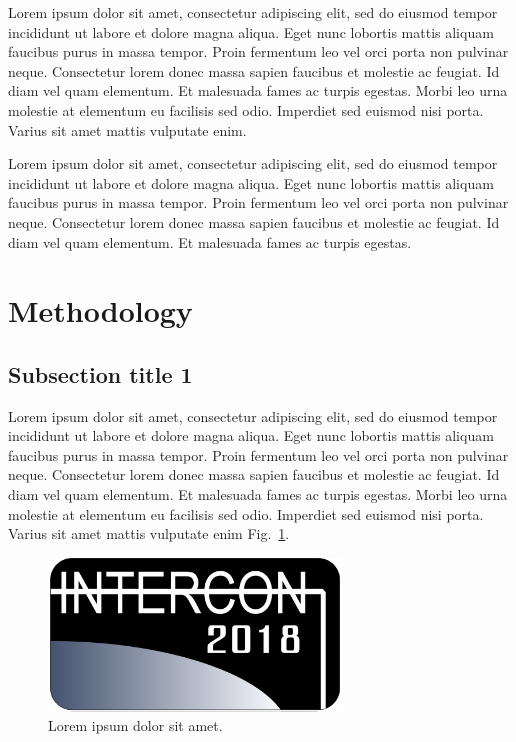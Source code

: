 \documentclass[conference]{IEEEtran}
\begin{document}
Lorem ipsum dolor sit amet, consectetur adipiscing elit, sed do eiusmod tempor incididunt ut labore et dolore magna aliqua. Eget nunc lobortis mattis aliquam faucibus purus in massa tempor. Proin fermentum leo vel orci porta non pulvinar neque. Consectetur lorem donec massa sapien faucibus et molestie ac feugiat. Id diam vel quam elementum. Et malesuada fames ac turpis egestas. Morbi leo urna molestie at elementum eu facilisis sed odio. Imperdiet sed euismod nisi porta. Varius sit amet mattis vulputate enim.

Lorem ipsum dolor sit amet, consectetur adipiscing elit, sed do eiusmod tempor incididunt ut labore et dolore magna aliqua. Eget nunc lobortis mattis aliquam faucibus purus in massa tempor. Proin fermentum leo vel orci porta non pulvinar neque. Consectetur lorem donec massa sapien faucibus et molestie ac feugiat. Id diam vel quam elementum. Et malesuada fames ac turpis egestas. 


\section{Methodology}



\subsection{Subsection title 1}

Lorem ipsum dolor sit amet, consectetur adipiscing elit, sed do eiusmod tempor incididunt ut labore et dolore magna aliqua. Eget nunc lobortis mattis aliquam faucibus purus in massa tempor. Proin fermentum leo vel orci porta non pulvinar neque. Consectetur lorem donec massa sapien faucibus et molestie ac feugiat. Id diam vel quam elementum. Et malesuada fames ac turpis egestas. Morbi leo urna molestie at elementum eu facilisis sed odio. Imperdiet sed euismod nisi porta. Varius sit amet mattis vulputate enim Fig.~\ref{figure1}.

\begin{figure}[htbp]
\centerline{\includegraphics[width=78mm]{images/image-example.png}}
\caption{Lorem ipsum dolor sit amet.}
\label{figure1}
\end{figure}
\end{document}
